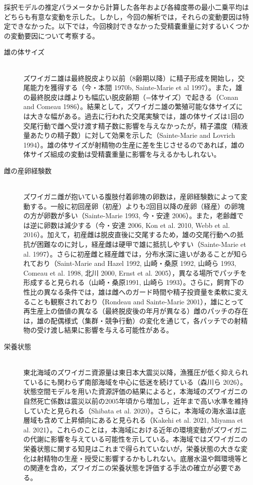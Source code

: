 採択モデルの推定パラメータから計算した各年および各緯度帯の最小二乗平均はどちらも有意な変動を示した。しかし，今回の解析では，それらの変動要因は特定できなかった。以下では，今回検討できなかった受精嚢重量に対するいくつかの変動要因について考察する。

\begin{description}
\item[雄の体サイズ] \mbox{} \\
ズワイガニ雄は最終脱皮より以前（8齢期以降）に精子形成を開始し，交尾能力を獲得する（今・本間 1970b, Sainte-Marie et al 1997）。また，雄の最終脱皮は雌よりも幅広い脱皮齢期（=体サイズ）で起きる（Conan and Comeau 1986）。結果として，ズワイガニ雄の繁殖可能な体サイズには大きな幅がある。過去に行われた交尾実験では，雄の体サイズは1回の交尾行動で雌へ受け渡す精子数に影響を与えなかったが，精子濃度（精液量あたりの精子数）に対して効果を示した（Sainte-Marie and Lovrich 1994）。雄の体サイズが射精物の生産に差を生じさせるのであれば，雄の体サイズ組成の変動は受精嚢重量に影響を与えるかもしれない。

\item[雌の産卵経験数] \mbox{} \\
ズワイガニ雌が抱いている腹肢付着卵塊の卵数は，産卵経験数によって変動する。一般に初回産卵（初産）よりも2回目以降の産卵（経産）の卵塊の方が卵数が多い（Sainte-Marie 1993, 今・安達 2006）。また，老齢雌では逆に卵数は減少する（今・安達 2006, Kon et al. 2010, Webb et al. 2016）。加えて，初産雌は脱皮直後に交尾するため，雄の交尾行動への抵抗が困難なのに対し，経産雌は硬甲で雄に抵抗しやすい（Sainte-Marie et al. 1997）。さらに初産雌と経産雌では，分布水深に違いがあることが知られており（Saint-Marie and Hazel 1992, 山崎・桑原 1992, 山崎ら 1993, Comeau et al. 1998, 北川 2000, Ernst et al. 2005），異なる場所でパッチを形成すると見られる（山崎・桑原1991, 山崎ら 1993）。さらに，飼育下の性比の異なる条件では，雄は雌へのガード時間や精子投資量を柔軟に変えることも観察されており（Rondeau and Sainte-Marie 2001），雄にとって再生産上の価値の異なる（最終脱皮後の年月が異なる）雌のパッチの存在は，雄の配偶様式（集群・競争行動）の変化を通じて，各パッチでの射精物の受け渡し結果に影響を与える可能性がある。

\item[栄養状態] \mbox{} \\
東北海域のズワイガニ資源量は東日本大震災以降，漁獲圧が低く抑えられているにも関わらず南部海域を中心に低迷を続けている（森川ら 2026）。状態空間モデルを用いた資源評価の結果によると，本海域のズワイガニの自然死亡係数は震災以前の2005年頃から増加し，近年まで高い水準を維持していたと見られる（Shibata et al. 2020）。さらに，本海域の海水温は底層域も含めて上昇傾向にあると見られる（Kakehi et al. 2021, Miyama et al. 2021）。これらのことは，本海域における近年の環境変動がズワイガニの代謝に影響を与えている可能性を示している。本海域ではズワイガニの栄養状態に関する知見はこれまで得られていないが，栄養状態の大きな変化は射精物の生産・授受に影響するかもしれない。底層水温や餌環境等との関連を含め，ズワイガニの栄養状態を評価する手法の確立が必要である。


\end{description}
